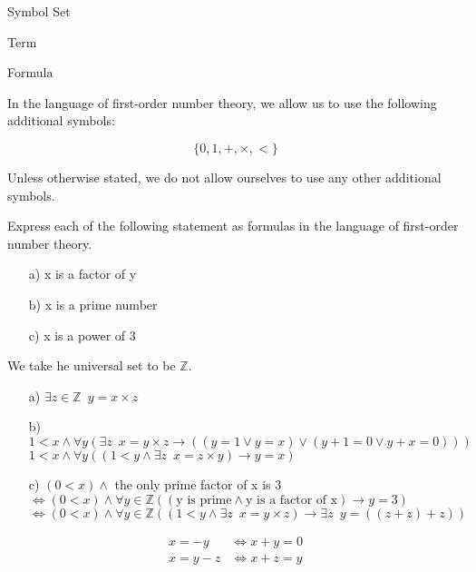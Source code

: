 

Symbol Set

Term

Formula



\begin{defn}
In the language of first-order number theory, we allow us to use the following additional symbols:

\[\{0,1,+,\times,<\}\]

Unless otherwise stated, we do not allow ourselves to use any other additional symbols.
\end{defn}

\begin{exmp}
Express each of the following statement as formulas in the language of first-order number theory.
\begin{enumerate}
\item[a)] x is a factor of y
\item[b)] x is a prime number
\item[c)] x is a power of 3
\end{enumerate}

\end{exmp}

\begin{solution}

We take he universal set to be \(\mathbb{Z}\).

\begin{enumerate}
\item[a)] \(\exists z\in \mathbb{Z}\enspace y=x\times z\)
\item[b)] \(1<x\wedge \forall y (\exists z \enspace x=y\times z \to ((y=1\vee y=x)\vee(y+1=0\vee y+x=0) ))\) \\
	\(1<x\wedge \forall y ((1<y\wedge \exists z \enspace x=z\times y)\to y=x)\)
    
\item[c)] \((0<x )\wedge\) the only prime factor of x is 3\\
\(\iff (0<x) \wedge \forall y\in \mathbb{Z} ((\text{y is prime}\wedge \text{y is a factor of x})\to y=3)\)\\
\(\iff (0<x) \wedge \forall y\in \mathbb{Z} ((1<y\wedge\exists z \enspace x=y\times z) \to \exists z\enspace y=((z+z)+z))\)

\end{enumerate}
\begin{align*}
x=-y &\iff x+y=0\\
x=y-z &\iff x+z=y
\end{align*}


\end{solution}

